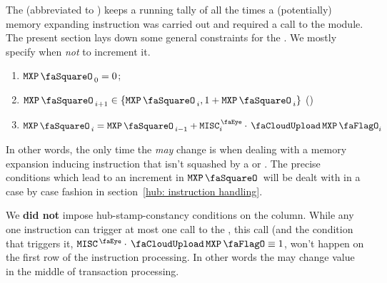 The \mxpSTAMP{} (abbreviated to \mxpStamp{}) keeps a running tally of all the times a (potentially) memory expanding instruction was carried out and required a call to the \mxpMod{} module. The present section lays down some general constraints for the \mxpStamp{}. We mostly specify when \emph{not} to increment it.
\begin{enumerate}
	\item $\mxpStamp_{0} = 0$;
	\item $\mxpStamp_{i + 1} \in \{ \mxpStamp_{i}, 1 + \mxpStamp_{i} \}$ (\trash)
	\item $\mxpStamp_{i} = \mxpStamp_{i - 1} + \peekMisc_{i} \cdot \miscMxpFlag_{i}$
\end{enumerate}
In other words, the only time the \mxpStamp{} \emph{may} change is when dealing with a memory expansion inducing instruction that isn't squashed by a \suxSH{} or \soxSH{}. The precise conditions which lead to an increment in $\mxpStamp$ will be dealt with in a case by case fashion in section~\ref{hub: instruction handling}.

\saNote{}
We \textbf{did not} impose hub-stamp-constancy conditions on the \mxpStamp{} column.
While any one instruction can trigger at most one call to the \mxpMod{}, this call (and the condition that triggers it, $\peekMisc \cdot \miscMxpFlag \equiv 1$, won't happen on the first row of the instruction processing.
In other words the \mxpStamp{} may change value in the middle of transaction processing.
